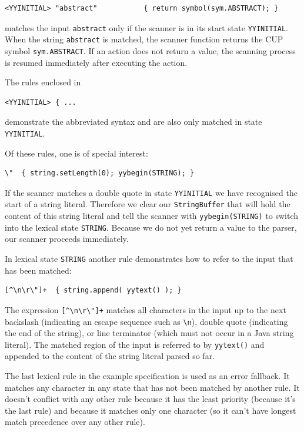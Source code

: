 \begin{verbatim}
<YYINITIAL> "abstract"           { return symbol(sym.ABSTRACT); }
\end{verbatim}

matches the input \texttt{abstract} only if the scanner is in its start
state \texttt{YYINITIAL}. When the string \texttt{abstract} is matched,
the scanner function returns the CUP symbol \texttt{sym.ABSTRACT}. If an
action does not return a value, the scanning process is resumed
immediately after executing the action.

The rules enclosed in

\begin{verbatim}
<YYINITIAL> { ...
\end{verbatim}

demonstrate the abbreviated syntax and are also only matched in state
\texttt{YYINITIAL}.

Of these rules, one is of special interest:

\begin{verbatim}
\"  { string.setLength(0); yybegin(STRING); }
\end{verbatim}

If the scanner matches a double quote in state \texttt{YYINITIAL} we
have recognised the start of a string literal. Therefore we clear our
\texttt{StringBuffer} that will hold the content of this string literal
and tell the scanner with \texttt{yybegin(STRING)} to switch into the
lexical state \texttt{STRING}. Because we do not yet return a value to
the parser, our scanner proceeds immediately.

In lexical state \texttt{STRING} another rule demonstrates how to refer
to the input that has been matched:

\begin{verbatim}
[^\n\r\"]+  { string.append( yytext() ); }
\end{verbatim}

The expression
\texttt{{[}\^{}\textbackslash{}n\textbackslash{}r\textbackslash{}"{]}+}
matches all characters in the input up to the next backslash (indicating
an escape sequence such as \texttt{\textbackslash{}n}), double quote
(indicating the end of the string), or line terminator (which must not
occur in a Java string literal). The matched region of the input is
referred to by \texttt{yytext()} and appended to the content of the
string literal parsed so far.

The last lexical rule in the example specification is used as an error
fallback. It matches any character in any state that has not been
matched by another rule. It doesn't conflict with any other rule because
it has the least priority (because it's the last rule) and because it
matches only one character (so it can't have longest match precedence
over any other rule).

